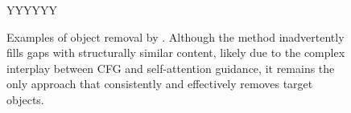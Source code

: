 \begin{figure}[h]
\begin{tabularx}{\columnwidth}{ YYYYYY }
        \end{tabularx}
    \caption{Examples of object removal by \method{}. Although the method inadvertently fills gaps with structurally similar content, likely due to the complex interplay between CFG and self-attention guidance, it remains the only approach that consistently and effectively removes target objects.}
    \label{fig:sup_structpres}
  \end{figure}